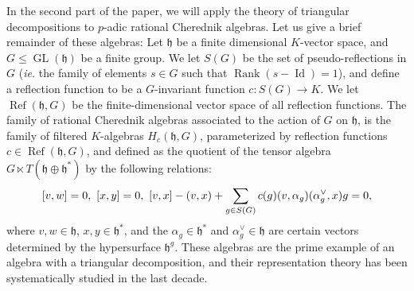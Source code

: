 \documentclass{amsart}
\begin{document}
In the second part of the paper, we will apply the theory of triangular decompositions to $p$-adic rational Cherednik algebras. Let us give a brief remainder of these algebras: Let $\mathfrak{h}$ be a finite dimensional $K$-vector space, and $G\leq \operatorname{GL}(\mathfrak{h})$ be a finite group. We let $S(G)$ be the set of pseudo-reflections in $G$ (\emph{ie.} the family of elements $s\in G$ such that $\operatorname{Rank}(s-\operatorname{Id})=1$), and define a reflection function to be a $G$-invariant function $c:S(G)\rightarrow K$. We let $\operatorname{Ref}(\mathfrak{h},G)$ be the finite-dimensional vector space of all reflection functions. The family of rational Cherednik algebras associated to the action of $G$ on $\mathfrak{h}$, is the family of filtered $K$-algebras $H_{c}(\mathfrak{h},G)$,
parameterized by  reflection functions $c\in \operatorname{Ref}(\mathfrak{h},G)$, and defined as the quotient of the tensor algebra 
$G\ltimes T(\mathfrak{h}\oplus \mathfrak{h}^*)$ by the following relations:
\begin{equation}\label{equation relations rat cher alg}
   [v,w]=0, \textnormal{ } [x,y]=0, \textnormal{ } [v,x]-(v,x)+\sum_{g\in S(G)}c(g)(v,\alpha_g)(\alpha_g^{\vee},x)g=0,
\end{equation}
where $v,w\in \mathfrak{h}$,  $x,y\in \mathfrak{h}^*$, and the $\alpha_g\in \mathfrak{h}^*$ and $\alpha_g^{\vee}\in \mathfrak{h}$  are certain vectors determined by the hypersurface $\mathfrak{h}^g$. These algebras are the prime example of an algebra with a triangular decomposition, and their representation theory has been systematically studied in the last decade. 
\bigskip
\end{document}
